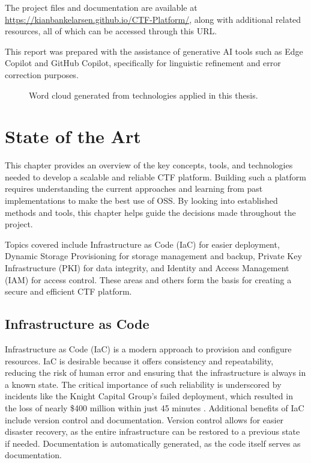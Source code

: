 The project files and documentation are available at \url{https://kianbankelarsen.github.io/CTF-Platform/}, along with additional related resources, all of which can be accessed through this URL.

This report was prepared with the assistance of generative AI tools such as Edge Copilot and GitHub Copilot, specifically for linguistic refinement and error correction purposes.

\vspace*{\fill}

\begin{figure}[H]
    \centering
    
    \caption{Word cloud generated from technologies applied in this thesis.}
    \label{fig:wordcloud}
\end{figure}

\vspace*{\fill}

\chapter{State of the Art}

This chapter provides an overview of the key concepts, tools, and technologies needed to develop a scalable and reliable CTF platform. Building such a platform requires understanding the current approaches and learning from past implementations to make the best use of OSS. By looking into established methods and tools, this chapter helps guide the decisions made throughout the project.

Topics covered include Infrastructure as Code (IaC) for easier deployment, Dynamic Storage Provisioning for storage management and backup, Private Key Infrastructure (PKI) for data integrity, and Identity and Access Management (IAM) for access control. These areas and others form the basis for creating a secure and efficient CTF platform.

\section{Infrastructure as Code}

Infrastructure as Code (IaC) is a modern approach to provision and configure resources. IaC is desirable because it offers consistency and repeatability, reducing the risk of human error and ensuring that the infrastructure is always in a known state. The critical importance of such reliability is underscored by incidents like the Knight Capital Group's failed deployment, which resulted in the loss of nearly \$400 million within just 45 minutes \Parencite{seven2014knightmare}. Additional benefits of IaC include version control and documentation. Version control allows for easier disaster recovery, as the entire infrastructure can be restored to a previous state if needed. Documentation is automatically generated, as the code itself serves as documentation. 

